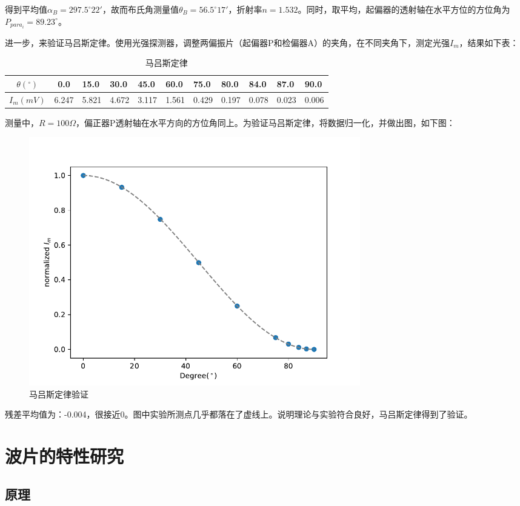 \documentclass[12pt]{article}
\begin{document}
得到平均值$\alpha_B = 297.5^\circ22'$，故而布氏角测量值$\theta_B = 56.5^\circ 17'$，折射率$n=1.532$。同时，取平均，起偏器的透射轴在水平方位的方位角为$P_{para_i}=89.23^\circ$。

进一步，来验证马吕斯定律。使用光强探测器，调整两偏振片（起偏器P和检偏器A）的夹角，在不同夹角下，测定光强$I_m$，结果如下表：

\begin{table}[H]
    \centering
    \begin{tabular}{|c|c|l|l|l|l|l|l|l|l|l|}
    \hline
    $\theta (^\circ)$ & 0.0   & 15.0  & 30.0  & 45.0  & 60.0  & 75.0  & 80.0  & 84.0  & 87.0  & 90.0  \\ \hline
    $I_m(mV)$    & 6.247 & 5.821 & 4.672 & 3.117 & 1.561 & 0.429 & 0.197 & 0.078 & 0.023 & 0.006 \\ \hline
    \end{tabular}
    \caption{马吕斯定律}
    \label{tab:A2}
\end{table}

测量中，$R=100\Omega$，偏正器P透射轴在水平方向的方位角同上。为验证马吕斯定律，将数据归一化，并做出图，如下图：

\begin{figure}[H]
    \centering
    \includegraphics[width = 0.7\textwidth]{fig1.pdf}
    \caption{马吕斯定律验证}
    \label{fig:1}
\end{figure}

残差平均值为：-0.004，很接近0。图中实验所测点几乎都落在了虚线上。说明理论与实验符合良好，马吕斯定律得到了验证。

\section{波片的特性研究}

\subsection{原理}
\end{document}
